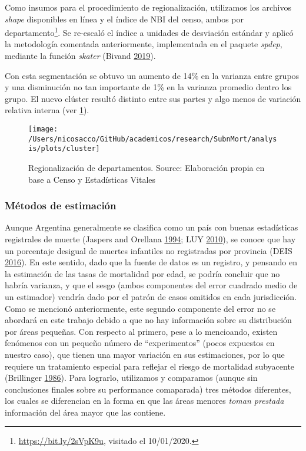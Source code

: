 \documentclass[12pt,]{article}
\begin{document}
Como insumos para el procedimiento de regionalización, utilizamos los
archivos \emph{shape} disponibles en línea y el índice de NBI del censo,
ambos por departamento\footnote{\url{https://bit.ly/2sVpK9u}, visitado
  el 10/01/2020.}. Se re-escaló el índice a unidades de desviación
estándar y aplicó la metodología comentada anteriormente, implementada
en el paquete \emph{spdep}, mediante la función \emph{skater} (Bivand
\protect\hyperlink{ref-Bivand2019}{2019}).

Con esta segmentación se obtuvo un aumento de 14\% en la varianza entre
grupos y una disminución no tan importante de 1\% en la varianza
promedio dentro los grupo. El nuevo clúster resultó distinto entre sus
partes y algo menos de variación relativa interna (ver
\ref{fig:cluster}).

\begin{figure}

{\centering \texttt{[image: /Users/nicosacco/GitHub/academicos/research/SubnMort/analysis/plots/cluster]} 

}

\caption{Regionalización de departamentos. Source: Elaboración propia en base a Censo y Estadísticas Vitales}\label{fig:cluster}
\end{figure}

\hypertarget{muxe9todos-de-estimaciuxf3n}{%
\subsubsection{Métodos de
estimación}\label{muxe9todos-de-estimaciuxf3n}}

Aunque Argentina generalmente se clasifica como un país con buenas
estadísticas registrales de muerte (Jaspers and Orellana
\protect\hyperlink{ref-JaspersOrellana1994}{1994}; LUY
\protect\hyperlink{ref-Luy2010}{2010}), se conoce que hay un porcentaje
desigual de muertes infantiles no registradas por provincia (DEIS
\protect\hyperlink{ref-DEIS2016}{2016}). En este sentido, dado que la
fuente de datos es un registro, y pensando en la estimación de las tasas
de mortalidad por edad, se podría concluir que no habría varianza, y que
el sesgo (ambos componentes del error cuadrado medio de un estimador)
vendría dado por el patrón de casos omitidos en cada jurisdicción. Como
se mencionó anteriormente, este segundo componente del error no se
abordará en este trabajo debido a que no hay información sobre su
distribución por áreas pequeñas. Con respecto al primero, pese a lo
mencioando, existen fenómenos con un pequeño número de ``experimentos''
(pocos expuestos en nuestro caso), que tienen una mayor variación en sus
estimaciones, por lo que requiere un tratamiento especial para reflejar
el riesgo de mortalidad subyacente (Brillinger
\protect\hyperlink{ref-Brillinger1986}{1986}). Para lograrlo, utilizamos
y comparamos (aunque sin conclusiones finales sobre su performance
comaparada) tres métodos diferentes, los cuales se diferencian en la
forma en que las áreas menores \emph{toman prestada} información del
área mayor que las contiene.
\end{document}
